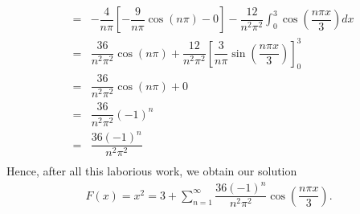 \documentclass[11pt]{article}
\begin{document}
\begin{solution}
\begin{eqnarray*}
& = &   -\dfrac{4}{n\pi} \left[ -\dfrac{9}{n\pi} \cos\left(n\pi\right) - 0 \right] - \dfrac{12}{n^2\pi^2} \int_{0}^{3}  \cos\left(\dfrac{n\pi x}{3}\right) dx \\
& = &   \dfrac{36}{n^2\pi^2} \cos\left(n\pi\right) + \dfrac{12}{n^2\pi^2} \left[  \dfrac{3}{n\pi} \sin\left(\dfrac{n\pi x}{3}\right) \right]_{0}^{3} \\
& = &   \dfrac{36}{n^2\pi^2} \cos\left(n\pi\right) + 0 \\
& = &   \dfrac{36}{n^2\pi^2} (-1)^n \\
& = &   \dfrac{36(-1)^{n}}{n^2\pi^2}  \\
\end{eqnarray*}
Hence, after all this laborious work, we obtain our solution
\begin{eqnarray*}
\boxed{F(x) =  x^2 = 3 + \sum_{n=1}^{\infty}  \dfrac{36(-1)^{n}}{n^2\pi^2} \cos\left(\dfrac{n\pi x}{3}\right)}.
\end{eqnarray*}
\end{solution}
\end{document}
